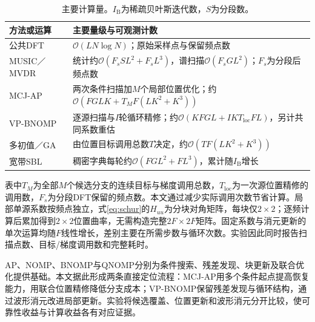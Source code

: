 \begin{table}[htbp]
\centering\small
\caption{主要计算量。$I_{\mathrm B}$为稀疏贝叶斯迭代数，$S$为分段数。}\label{tab:complexity}
\begin{tabularx}{\linewidth}{@{}lX@{}}\toprule
方法或运算 & 主要量级与可观测计数\\\midrule
公共DFT & $\mathcal O(LN\log N)$；原始采样点与保留频点数\\
MUSIC／MVDR & 统计约$\mathcal O(F_sSL^2+F_sL^3)$，谱扫描$\mathcal O(F_sGL^2)$；$F_s$为分段后频点数\\
MCJ-AP & 两次条件扫描加$M$个局部位置优化；约$\mathcal O(FGLK+T_MF(LK^2+K^3))$\\
VP-BNOMP & 逐源扫描与$I$轮循环精修；约$\mathcal O(KFGL+IKT_{\mathrm{loc}}FL)$，另计共同系数重估\\
多初值／GA & 由位置目标调用总数$T$决定，约$\mathcal O(TF(LK^2+K^3))$\\
宽带SBL & 稠密字典每轮约$\mathcal O(FGL^2+FL^3)$，累计随$I_{\mathrm B}$增长\\\bottomrule
\end{tabularx}
\end{table}
表中$T_M$为全部$M$个候选分支的连续目标与梯度调用总数，$T_{\mathrm{loc}}$为一次源位置精修的调用数，$F_s$为分段DFT保留的频点数。本文通过减少实际调用次数节省计算。局部单源系数按频点独立，式\eqref{eq:schur}的$H_{uu}$为分块对角矩阵，每块仅$2\times2$；逐频计算后累加得到$2\times2$位置曲率，无需构造完整$2F\times2F$矩阵。固定系数与消元更新的单次运算均随$F$线性增长，差别主要在所需步数与循环次数。实验因此同时报告扫描点数、目标/梯度调用数和完整耗时。

AP、NOMP、BNOMP与QNOMP分别为条件搜索、残差发现、块更新及联合优化提供基础\cite{ChenHudsonYao2002,Mamandipoor2016,Yang2022,Zeng2025}。本文据此形成两条直接定位流程：MCJ-AP用多个条件起点提高恢复能力，用联合位置精修降低分支成本；VP-BNOMP保留残差发现与循环结构，通过波形消元改进局部更新。实验将候选覆盖、位置更新和波形消元分开比较，使可靠性收益与计算收益各有对应证据。
